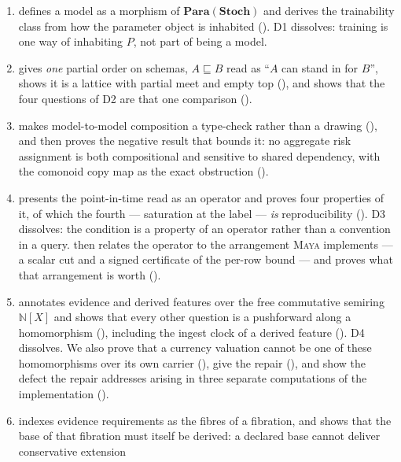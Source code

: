 \documentclass[11pt,a4paper]{article}
\renewcommand{\_}{\oldunderscore\allowbreak}
\theoremstyle{plain}
\theoremstyle{definition}
\theoremstyle{definition}
\theoremstyle{remark}
\newcommand{\Cat}[1]{\mathbf{#1}}
\newcommand{\Stoch}{\Cat{Stoch}}
\newcommand{\Para}{\mathbf{Para}}
\newcommand{\Nat}{\mathbb{N}}
\begin{document}
\begin{enumerate}[leftmargin=*,itemsep=3pt]
\item {} defines a model as a morphism of $\Para(\Stoch)$ and derives the trainability
      class from how the parameter object is inhabited (). D1 dissolves:
      training is one way of inhabiting $P$, not part of being a model.
\item {} gives \emph{one} partial order on schemas, $A \sqsubseteq B$ read as ``$A$ can
      stand in for $B$'', shows it is a lattice with partial meet and empty top
      (), and shows that the four questions of D2 are that one comparison
      ().
\item {} makes model-to-model composition a type-check rather than a drawing
      (), and then proves the negative result that bounds it: no aggregate risk
      assignment is both compositional and sensitive to shared dependency, with the comonoid copy map as
      the exact obstruction ().
\item {} presents the point-in-time read as an operator and proves four properties of it,
      of which the fourth --- saturation at the label --- \emph{is} reproducibility
      (). D3 dissolves: the condition is a property of an operator rather
      than a convention in a query.  then relates the operator to the arrangement
      \textsc{Maya} implements --- a scalar cut and a signed certificate of the per-row bound --- and
      proves what that arrangement is worth ().
\item {} annotates evidence and derived features over the free commutative semiring
      $\Nat[X]$ and shows that every other question is a pushforward along a homomorphism
      (), including the ingest clock of a derived feature
      (). D4 dissolves. We also prove that a currency valuation cannot be one of
      these homomorphisms over its own carrier (), give the repair
      (), and show the defect the repair addresses arising in three separate
      computations of the implementation ().
\item {} indexes evidence requirements as the fibres of a fibration, and shows that the
      base of that fibration must itself be derived: a declared base cannot deliver conservative extension

\end{enumerate}
\end{document}
